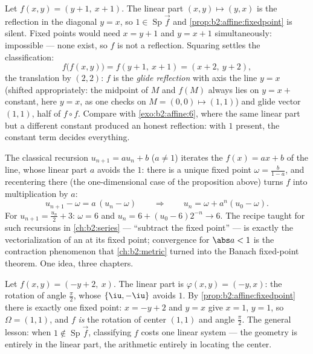 \begin{example}\label{ex:b2:affine:glide}
Let $f(x, y) = (y + 1,\ x + 1)$. The linear part $(x, y)
\mapsto (y, x)$ is the reflection in the diagonal $y = x$, so
$1 \in \operatorname{Sp}\vec f$ and
\cref{prop:b2:affine:fixedpoint} is silent. Fixed points
would need $x = y + 1$ and $y = x + 1$ simultaneously:
impossible --- none exist, so $f$ is not a reflection. Squaring
settles the classification:
\[
f\bigl(f(x, y)\bigr) = f(y + 1,\ x + 1) = (x + 2,\ y + 2),
\]
the translation by $(2, 2)$: $f$ is the \emph{glide
reflection} with axis the line $y = x$ (shifted
appropriately: the midpoint of $M$ and $f(M)$ always lies on
$y = x + {}$constant, here $y = x$, as one checks on $M = (0,
0) \mapsto (1,1)$) and glide vector $(1, 1)$, half of $f
\circ f$. Compare with \cref{exo:b2:affine:6}, where the same
linear part but a different constant produced an honest
reflection: with  $1$ present, the constant term
decides everything.
\end{example}

\begin{example}\label{ex:b2:affine:recursion}
The classical recursion $u_{n+1} = au_n + b$ ($a \neq 1$)
iterates the  $f(x) = ax + b$ of the line, whose
linear part $a$ avoids the  $1$: there is a unique
fixed point $\omega = \frac{b}{1-a}$, and recentering there
(the one-dimensional case of the proposition above) turns
$f$ into multiplication by $a$:
\[
u_{n+1} - \omega = a\,(u_n - \omega)
\qquad\Longrightarrow\qquad
u_n = \omega + a^n(u_0 - \omega) .
\]
For $u_{n+1} = \frac{u_n}2 + 3$: $\omega = 6$ and $u_n = 6 +
(u_0 - 6)2^{-n} \to 6$. The recipe taught for such
recursions in \cref{ch:b2:series} --- ``subtract the fixed
point'' --- is exactly the vectorialization of an 
at its fixed point; convergence for $\abs a < 1$ is the
contraction phenomenon that \cref{ch:b2:metric} turned into
the Banach fixed-point theorem. One idea, three chapters.
\end{example}

\begin{example}\label{ex:b2:affine:rotationcenter}
Let $f(x, y) = (-y + 2,\ x)$. The linear part is
$\varphi(x, y) = (-y, x)$: the rotation of angle $\frac\pi2$,
whose  $\{\iu, -\iu\}$ avoids $1$. By
\cref{prop:b2:affine:fixedpoint} there is exactly one fixed
point: $x = -y + 2$ and $y = x$ give $x = 1$, $y = 1$, so
$\Omega = (1, 1)$, and $f$ \emph{is} the rotation of center
$(1, 1)$ and angle $\frac\pi2$. The general lesson: when $1
\notin \operatorname{Sp}\vec f$, classifying $f$ costs one
linear system --- the geometry is entirely in the linear part,
the arithmetic entirely in locating the center.
\end{example}

